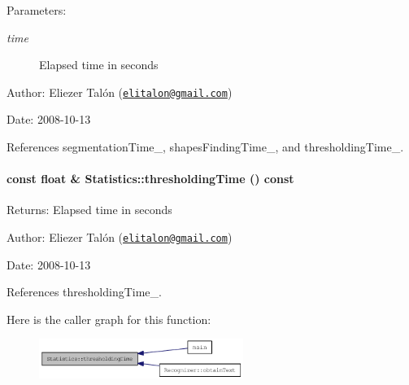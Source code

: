 \begin{Desc}
\item[Parameters:]
\begin{description}
\item[{\em time}]Elapsed time in seconds\end{description}
\end{Desc}
\begin{Desc}
\item[Author:]Eliezer Talón (\href{mailto:elitalon@gmail.com}{\tt elitalon@gmail.com}) \end{Desc}
\begin{Desc}
\item[Date:]2008-10-13 \end{Desc}


References segmentationTime\_\-, shapesFindingTime\_\-, and thresholdingTime\_\-.\hypertarget{class_statistics_79a7c11e89528f21b663153c2636216a}{
\paragraph[{thresholdingTime}]{\setlength{\rightskip}{0pt plus 5cm}const float \& Statistics::thresholdingTime () const}\hfill}
\label{class_statistics_79a7c11e89528f21b663153c2636216a}


\begin{Desc}
\item[Returns:]Elapsed time in seconds\end{Desc}
\begin{Desc}
\item[Author:]Eliezer Talón (\href{mailto:elitalon@gmail.com}{\tt elitalon@gmail.com}) \end{Desc}
\begin{Desc}
\item[Date:]2008-10-13 \end{Desc}


References thresholdingTime\_\-.

Here is the caller graph for this function:\nopagebreak
\begin{figure}[H]
\begin{center}
\leavevmode
\includegraphics[width=188pt]{class_statistics_79a7c11e89528f21b663153c2636216a_icgraph}
\end{center}
\end{figure}
